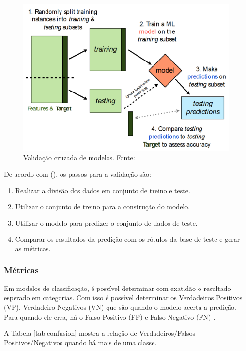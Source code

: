 \begin{figure}[h]
	\centering
    \includegraphics[keepaspectratio=true,scale=0.7]{figuras/crossValidation}
	\caption[Validação cruzada de modelos]{Validação cruzada de modelos. Fonte: \cite[Página 82]{BRINK2015}}
	\label{fig:crossValidation}
\end{figure}

De acordo com \citeauthor{BRINK2015} (\citeyear{BRINK2015}), os passos para a validação são: 
\begin{enumerate}
	\item Realizar a divisão dos dados em conjunto de treino e teste.
	\item Utilizar o conjunto de treino para a construção do modelo.
    \item Utilizar o modelo para predizer o conjunto de dados de teste.
    \item Comparar os resultados da predição com os rótulos da base de teste e gerar as métricas.
\end{enumerate}

\subsubsection{Métricas}

Em modelos de classificação, é possível determinar com exatidão o resultado esperado em categorias. Com isso é possível determinar os Verdadeiros Positivos (VP), Verdadeiro Negativos (VN) que são quando o modelo acerta a predição. Para quando ele erra, há o Falso Positivo (FP) e Falso Negativo (FN) \cite{BRINK2015}.

A Tabela \ref{tab:confusion} mostra a relação de Verdadeiros/Falsos Positivos/Negativos quando há mais de uma classe.

